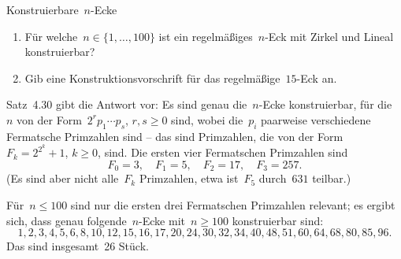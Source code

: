\documentclass{algblatt}
\begin{document}
\vspace*{-1.5cm}

\begin{aufgabe}{Konstruierbare~$n$-Ecke}
\begin{enumerate}
\item Für welche~$n \in \{ 1,\ldots,100 \}$ ist ein regelmäßiges~$n$-Eck
mit Zirkel und Lineal konstruierbar?
\item Gib eine Konstruktionsvorschrift für das regelmäßige~$15$-Eck an.
\end{enumerate}

\begin{loesungE}
\item Satz~4.30 gibt die Antwort vor: Es sind genau die~$n$-Ecke konstruierbar,
für die~$n$ von der Form~$2^r p_1 \cdots p_s$, $r,s \geq 0$ sind, wobei
die~$p_i$ paarweise verschiedene Fermatsche Primzahlen sind -- das sind
Primzahlen, die von der Form~$F_k = 2^{2^k} + 1$, $k \geq 0$, sind. Die ersten
vier Fermatschen Primzahlen sind
\[ F_0 = 3,\quad
  F_1 = 5,\quad
  F_2 = 17,\quad
  F_3 = 257. \]
(Es sind aber nicht alle~$F_k$ Primzahlen, etwa ist~$F_5$ durch~$631$ teilbar.)

Für~$n \leq 100$ sind nur die ersten drei Fermatschen Primzahlen relevant; es
ergibt sich, dass genau folgende~$n$-Ecke mit~$n \geq 100$ konstruierbar
sind:
\[ 1,2,3,4,5,6,8,10,12,15,16,17,20,24,30,32,34,40,48,51,60,64,68,80,85,96. \]
Das sind insgesamt~26 Stück.
\end{loesungE}
\end{aufgabe}
\end{document}
